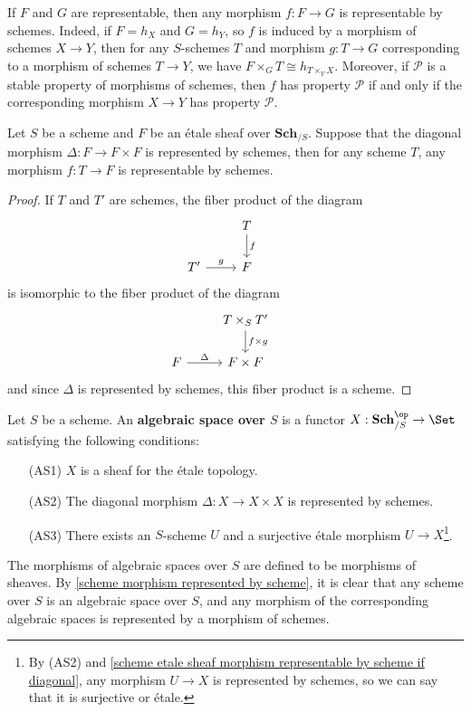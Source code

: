 \begin{example}\label{scheme morphism represented by scheme}
If $F$ and $G$ are representable, then any morphism $f:F\to G$ is representable by schemes. Indeed, if $F=h_X$ and $G=h_Y$, so $f$ is induced by a morphism of schemes $X\to Y$, then for any $S$-schemes $T$ and morphism $g:T\to G$ corresponding to a morphism of schemes $T\to Y$, we have $F\times_GT\cong h_{T\times_YX}$. Moreover, if $\mathcal{P}$ is a stable property of morphisms of schemes, then $f$ has property $\mathcal{P}$ if and only if the corresponding morphism $X\to Y$ has property $\mathcal{P}$.
\end{example}

\begin{proposition}\label{scheme etale sheaf morphism representable by scheme if diagonal}
Let $S$ be a scheme and $F$ be an \'etale sheaf over $\mathbf{Sch}_{/S}$. Suppose that the diagonal morphism $\Delta:F\to F\times F$ is represented by schemes, then for any scheme $T$, any morphism $f:T\to F$ is representable by schemes.
\end{proposition}
\begin{proof}
If $T$ and $T'$ are schemes, the fiber product of the diagram
\[\begin{tikzcd}
&T\ar[d,"f"]&\\
T'\ar[r,"g"]&F
\end{tikzcd}\]
is isomorphic to the fiber product of the diagram
\[\begin{tikzcd}
&T\times_ST'\ar[d,"f\times g"]&\\
F\ar[r,"\Delta"]&F\times F
\end{tikzcd}\]
and since $\Delta$ is represented by schemes, this fiber product is a scheme.
\end{proof}

Let $S$ be a scheme. An \textbf{algebraic space over $S$} is a functor $X:\mathbf{Sch}_{/S}^{\op}\to \Set$ satisfying the following conditions:
\begin{enumerate}[leftmargin=40pt]
    \item[(AS1)] $X$ is a sheaf for the \'etale topology.
    \item[(AS2)] The diagonal morphism $\Delta:X\to X\times X$ is represented by schemes.
    \item[(AS3)] There exists an $S$-scheme $U$ and a surjective \'etale morphism $U\to X$\footnote{By (AS2) and \cref{scheme etale sheaf morphism representable by scheme if diagonal}, any morphism $U\to X$ is represented by schemes, so we can say that it is surjective or \'etale.}.
\end{enumerate}
The morphisms of algebraic spaces over $S$ are defined to be morphisms of sheaves. By \cref{scheme morphism represented by scheme}, it is clear that any scheme over $S$ is an algebraic space over $S$, and any morphism of the corresponding algebraic spaces is represented by a morphism of schemes.\par

